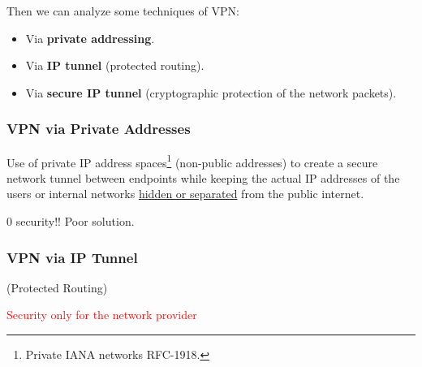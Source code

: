 Then we can analyze some techniques of VPN:
\begin{itemize}
    \item Via \textbf{private addressing}.
    \item Via \textbf{IP tunnel} (protected routing).
    \item Via \textbf{secure IP tunnel} (cryptographic protection of the network packets).
\end{itemize}
\begin{center}
    \subsubsection{VPN via Private Addresses}
\end{center}
Use of private IP address spaces\footnote{Private IANA networks RFC-1918.} (non-public addresses) to create a secure network tunnel between endpoints while keeping the actual IP addresses of the users or internal networks \underline{hidden or separated} from the public internet.


\begin{tcolorbox}[colback=red!10!white, colframe=red!70!black, coltitle=white, title=Be aware] 
0 security!! Poor solution.
\end{tcolorbox}

\clearpage
    \subsubsection{VPN via IP Tunnel}
\begin{center}
    (Protected Routing)

    \textcolor{red}{Security only for the network provider}
\end{center}



